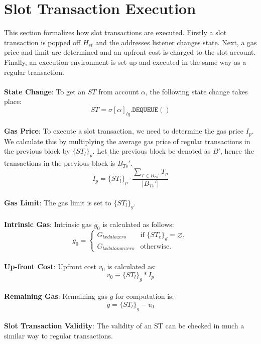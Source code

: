 \documentclass{article}
\begin{document}
\section{Slot Transaction Execution}
This section formalizes how slot transactions are executed. Firstly a slot transaction is popped off $H_{st}$ and the addresses listener changes state. Next, a gas price and limit are determined and an upfront cost is charged to the slot account. Finally, an execution environment is set up and executed in the same way as a regular transaction.
\\\\
\textbf{State Change}: To get an $ST$ from account $\alpha$, the following state change takes place:
\begin{equation*}
ST = \sigma[\alpha]_{lq}.\texttt{DEQUEUE}()
\end{equation*}
\\
\textbf{Gas Price}: To execute a slot transaction, we need to determine the gas price $I_p$. We calculate this by multiplying the average gas price of regular transactions in the previous block by $\{ST_l\}_p$. Let the previous block be denoted as $B'$, hence the transactions in the previous block is $B_{Ts}'$.
\begin{equation*}
I_p = \{ST_l\}_p \cdot \frac{\sum_{T \in B_{Ts}'} T_p}{|B_{Ts}'|} 
\end{equation*}
\\
\textbf{Gas Limit}: The gas limit is set to $\{ST_l\}_g$.
\\\\
\textbf{Intrinsic Gas}: Intrinsic gas $g_0$ is calculated as follows: 
\begin{equation*}
g_0 = 
\begin{cases}
G_{txdatazero}    &\text{if } \{ST_e\}_d=\varnothing,\\
G_{txdatanonzero} &\text{otherwise.}
\end{cases}
\end{equation*}
\\
\textbf{Up-front Cost}: Upfront cost $v_0$ is calculated as:
\begin{equation*}
    v_0 \equiv \{ST_l\}_g * I_p
\end{equation*}
\\
\textbf{Remaining Gas}: Remaining gas $g$ for computation is:
\begin{equation*}
    g = \{ST_l\}_g - v_0
\end{equation*}
\\
\textbf{Slot Transaction Validity}: The validity of an ST can be checked in much a similar way to regular transactions.
\end{document}

